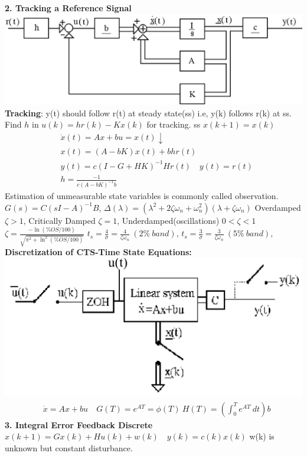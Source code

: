 \begin{multicols*}{3}
\textbf{2. Tracking a Reference Signal}
\includegraphics[width=\linewidth]{trackingRefSig.png}
\textbf{Tracking}: y(t) should follow r(t) at steady state(ss)
i.e, y(k) follows r(k) at ss. Find $h$ in $u(k)=hr(k) -Kx(k)$ for tracking. ss $x(k+1)=x(k)$
\begin{align*}
& \dot{x}(t)=Ax+bu=x(t) \downarrow \\
& x(t)=(A-bK)x(t)+bhr(t) \\
& y(t)= c(I-G+HK)^{-1}Hr(t) \quad y(t)=r(t) \\
& h = \frac{-1}{c(A-bK)^{-1}b}
\end{align*}
Estimation of unmeasurable state variables is commonly called observation. $G(s)=C(sI-A)^{-1}B$,
 $\Delta (\lambda)= (\lambda^2+2\zeta \omega_n+ \omega_n^2)(\lambda + \zeta \omega_n)$ \hfill \break 
Overdamped $\zeta > 1$, Critically Damped $\zeta=1$, Underdamped(oscillations) $0< \zeta < 1$
$\zeta = \frac{-\ln(\% OS /100)}{\sqrt{\pi^2 + \ln^2(\% OS /100)}}$
$t_{s} = \frac {4}{\sigma } = \frac {4}{\zeta \omega _{n}}\ \left ( 2\%\ band \right )$,
$t_{s} = \frac {3}{\sigma } = \frac {3}{\zeta \omega _{n}}\ \left ( 5\%\ band \right )$,
\columnbreak
\textbf{Discretization of CTS-Time State Equations:}
\includegraphics[width=\linewidth]{dis2CTS.png}
\begin{align*}
&  \dot{x}=Ax+bu \quad G(T)=e^{AT}= \phi(T) \ H(T) = (\int_0^T e^{AT} \ dt)b
\end{align*}
\textbf{3. Integral Error Feedback Discrete}
$
x(k+1)=Gx(k)+Hu(k)+w(k) \quad y(k)=c(k)x(k) 
$
w(k) is unknown but constant disturbance.


\end{multicols*}
